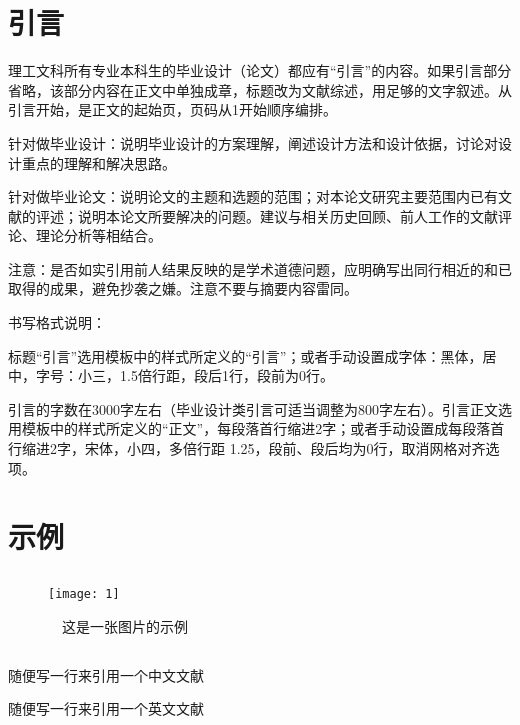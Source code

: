 \documentclass[UTF8,a4paper]{ctexart}
\numberwithin{table}{section}
\numberwithin{equation}{section}
\begin{document}
	\section*{\fontsize{15}{22.5} {\heiti 引\quad\quad 言}}
	理工文科所有专业本科生的毕业设计（论文）都应有“引言”的内容。如果引言部分省略，该部分内容在正文中单独成章，标题改为文献综述，用足够的文字叙述。从引言开始，是正文的起始页，页码从1开始顺序编排。\par 
	针对做毕业设计：说明毕业设计的方案理解，阐述设计方法和设计依据，讨论对设计重点的理解和解决思路。\par 
	针对做毕业论文：说明论文的主题和选题的范围；对本论文研究主要范围内已有文献的评述；说明本论文所要解决的问题。建议与相关历史回顾、前人工作的文献评论、理论分析等相结合。\par 
	注意：是否如实引用前人结果反映的是学术道德问题，应明确写出同行相近的和已取得的成果，避免抄袭之嫌。注意不要与摘要内容雷同。\par 
	书写格式说明：\par 
	标题“引言”选用模板中的样式所定义的“引言”；或者手动设置成字体：黑体，居中，字号：小三，1.5倍行距，段后1行，段前为0行。\par
	引言的字数在3000字左右（毕业设计类引言可适当调整为800字左右）。引言正文选用模板中的样式所定义的“正文”，每段落首行缩进2字；或者手动设置成每段落首行缩进2字，宋体，小四，多倍行距 1.25，段前、段后均为0行，取消网格对齐选项。
	\newpage
	\section{\fontsize{15}{22.5} {\heiti 示例}} 
	\subsection{}
	\begin{figure}[h]
		\centering
		\caption{\ \ 这是一张图片的示例}
		\texttt{[image: 1]}
	\end{figure}
	\subsection{}
	随便写一行来引用一个中文文献\cite{姬丽娜2017基于GPU的视频流人群实时计数}\par 
	随便写一行来引用一个英文文献\cite{Hubel1962Receptive}
	\newpage
\end{document}
